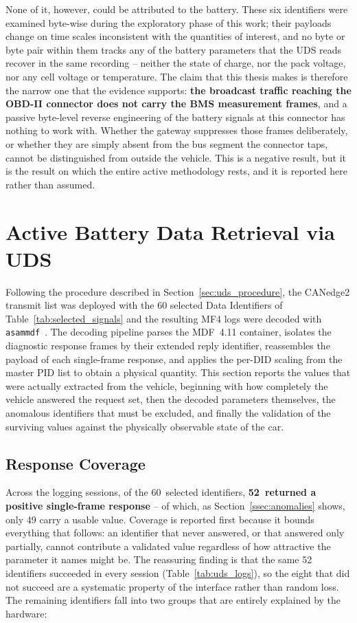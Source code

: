 \documentclass[11pt,a4paper,oneside,parskip=half]{scrreprt}
\begin{document}
None of it, however, could be attributed to the battery. These six identifiers were examined byte-wise during the exploratory phase of this work; their payloads change on time scales inconsistent with the quantities of interest, and no byte or byte pair within them tracks any of the battery parameters that the UDS reads recover in the same recording -- neither the state of charge, nor the pack voltage, nor any cell voltage or temperature. The claim that this thesis makes is therefore the narrow one that the evidence supports: \textbf{the broadcast traffic reaching the OBD-II connector does not carry the BMS measurement frames}, and a passive byte-level reverse engineering of the battery signals at this connector has nothing to work with. Whether the gateway suppresses those frames deliberately, or whether they are simply absent from the bus segment the connector taps, cannot be distinguished from outside the vehicle. This is a negative result, but it is the result on which the entire active methodology rests, and it is reported here rather than assumed.

\section{Active Battery Data Retrieval via UDS}
Following the procedure described in Section~\ref{sec:uds_procedure}, the CANedge2 transmit list was deployed with the 60 selected Data Identifiers of Table~\ref{tab:selected_signals} and the resulting MF4 logs were decoded with \texttt{asammdf}~\cite{asammdf}. The decoding pipeline parses the MDF~4.11 container, isolates the diagnostic response frames by their extended reply identifier, reassembles the payload of each single-frame response, and applies the per-DID scaling from the master PID list to obtain a physical quantity. This section reports the values that were actually extracted from the vehicle, beginning with how completely the vehicle answered the request set, then the decoded parameters themselves, the anomalous identifiers that must be excluded, and finally the validation of the surviving values against the physically observable state of the car.

\subsection{Response Coverage}
\label{ssec:coverage}
Across the logging sessions, of the 60~selected identifiers, \textbf{52~returned a positive single-frame response} -- of which, as Section~\ref{ssec:anomalies} shows, only 49 carry a usable value. Coverage is reported first because it bounds everything that follows: an identifier that never answered, or that answered only partially, cannot contribute a validated value regardless of how attractive the parameter it names might be. The reassuring finding is that the same 52 identifiers succeeded in every session (Table~\ref{tab:uds_logs}), so the eight that did not succeed are a systematic property of the interface rather than random loss. The remaining identifiers fall into two groups that are entirely explained by the hardware:
\end{document}
